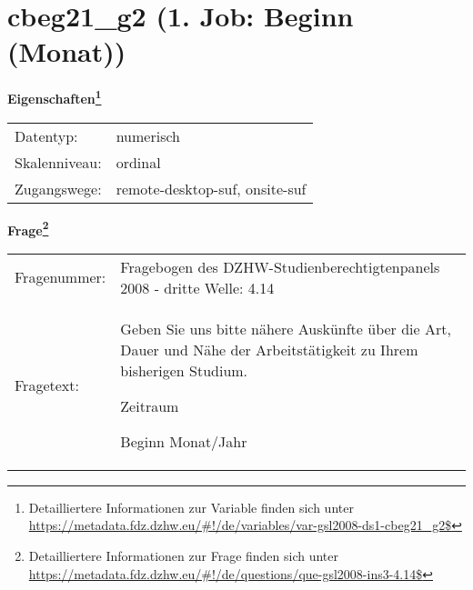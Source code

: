 
    \setcounter{footnote}{0}

    \vspace*{-1.8cm}
	\section{cbeg21\_g2 (1. Job: Beginn (Monat))}
	\label{section:cbeg21_g2}



    \vspace*{0.5cm}
    \noindent\textbf{Eigenschaften\footnote{Detailliertere Informationen zur Variable finden sich unter
		\url{https://metadata.fdz.dzhw.eu/\#!/de/variables/var-gsl2008-ds1-cbeg21_g2$}}}\\
	\begin{tabularx}{\hsize}{@{}lX}
	Datentyp: & numerisch \\
	Skalenniveau: & ordinal \\
	Zugangswege: &
	  remote-desktop-suf, 
	  onsite-suf
 \\
    \end{tabularx}



				\vspace*{0.5cm}
                \noindent\textbf{Frage\footnote{Detailliertere Informationen zur Frage finden sich unter
		              \url{https://metadata.fdz.dzhw.eu/\#!/de/questions/que-gsl2008-ins3-4.14$}}}\\
				\begin{tabularx}{\hsize}{@{}lX}
					Fragenummer: &
					  Fragebogen des DZHW-Studienberechtigtenpanels 2008 - dritte Welle:
					  4.14
 \\
					Fragetext: & Geben Sie uns bitte nähere Auskünfte über die Art, Dauer und Nähe der Arbeitstätigkeit zu Ihrem bisherigen Studium.\par  Zeitraum\par  Beginn Monat/Jahr \\
				\end{tabularx}





